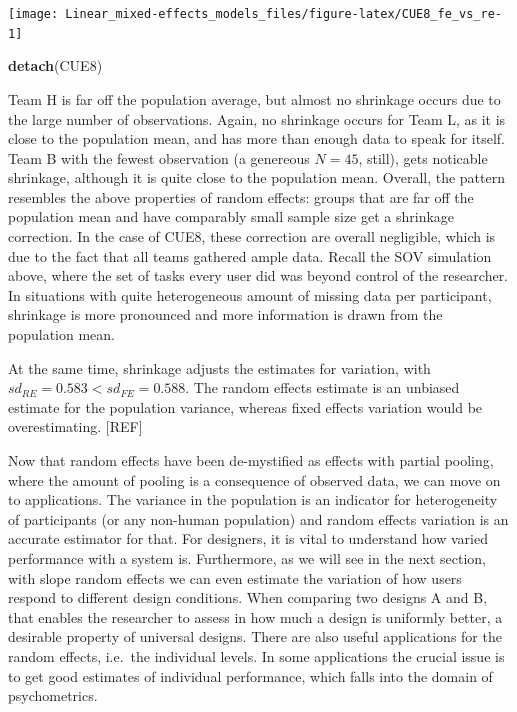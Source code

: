 \documentclass[]{svmono}
\newenvironment{Shaded}{\begin{snugshade}}{\end{snugshade}}
\newcommand{\KeywordTok}[1]{\textcolor[rgb]{0.13,0.29,0.53}{\textbf{#1}}}
\newcommand{\NormalTok}[1]{#1}
\begin{document}
\texttt{[image: Linear\_mixed-effects\_models\_files/figure-latex/CUE8\_fe\_vs\_re-1]}

\begin{Shaded}
\begin{Highlighting}[]
\KeywordTok{detach}\NormalTok{(CUE8)}
\end{Highlighting}
\end{Shaded}

Team H is far off the population average, but almost no shrinkage occurs
due to the large number of observations. Again, no shrinkage occurs for
Team L, as it is close to the population mean, and has more than enough
data to speak for itself. Team B with the fewest observation (a
genereous \(N = 45\), still), gets noticable shrinkage, although it is
quite close to the population mean. Overall, the pattern resembles the
above properties of random effects: groups that are far off the
population mean and have comparably small sample size get a shrinkage
correction. In the case of CUE8, these correction are overall
negligible, which is due to the fact that all teams gathered ample data.
Recall the SOV simulation above, where the set of tasks every user did
was beyond control of the researcher. In situations with quite
heterogeneous amount of missing data per participant, shrinkage is more
pronounced and more information is drawn from the population mean.

At the same time, shrinkage adjusts the estimates for variation, with
\(sd_{RE} = 0.583 < sd_{FE} = 0.588\). The random effects estimate is an
unbiased estimate for the population variance, whereas fixed effects
variation would be overestimating. {[}REF{]}

Now that random effects have been de-mystified as effects with partial
pooling, where the amount of pooling is a consequence of observed data,
we can move on to applications. The variance in the population is an
indicator for heterogeneity of participants (or any non-human
population) and random effects variation is an accurate estimator for
that. For designers, it is vital to understand how varied performance
with a system is. Furthermore, as we will see in the next section, with
slope random effects we can even estimate the variation of how users
respond to different design conditions. When comparing two designs A and
B, that enables the researcher to assess in how much a design is
uniformly better, a desirable property of universal designs. There are
also useful applications for the random effects, i.e.~the individual
levels. In some applications the crucial issue is to get good estimates
of individual performance, which falls into the domain of psychometrics.
\end{document}

